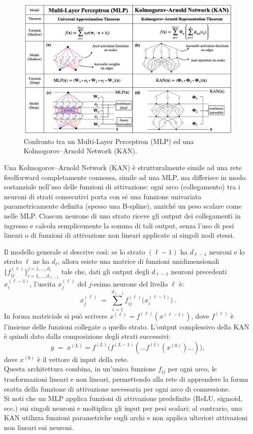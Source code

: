 \documentclass[a4paper,12pt]{report}
\begin{document}
	\begin{figure}[H]
		\centering
		\includegraphics[width=1.0\textwidth]{img/KANvsMLP.png}
		\caption{Confronto tra un Multi-Layer Perceptron (MLP) ed una Kolmogorov–Arnold Network (KAN).}
	\end{figure}
	Una Kolmogorov–Arnold Network (KAN) è strutturalmente simile ad una rete feedforward completamente connessa, simile ad una MLP, ma differisce in modo sostanziale nell'uso delle funzioni di attivazione: ogni arco (collegamento) tra i neuroni di strati consecutivi porta con sé una funzione univariata parametricamente definita (spesso una B-spline), anziché un peso scalare come nelle MLP. Ciascun neurone di uno strato riceve gli output dei collegamenti in ingresso e calcola semplicemente la somma di tali output, senza l’uso di pesi lineari o di funzioni di attivazione non lineari applicate ai singoli nodi stessi.
	
	Il modello generale si descrive così: se lo strato $(\ell-1)$ ha $d_{\ell-1}$ neuroni e lo strato $\ell$ ne ha $d_\ell$, allora esiste una matrice di funzioni unidimensionali $\{f^{(\ell)}_{ij}\}_{i=1,\dots,d_{\ell-1}}^{j=1,\dots,d_\ell}$ tale che, dati gli output degli $d_{\ell-1}$ neuroni precedenti $x_i^{(\ell-1)}$, l’uscita $x_j^{(\ell)}$ del $j$-esimo neurone del livello $\ell$ è: 
	\[
	x_j^{(\ell)} \;=\; \sum_{i=1}^{d_{\ell-1}} f^{(\ell)}_{ij}\bigl(x_i^{(\ell-1)}\bigr)\,.
	\] 
	In forma matriciale si può scrivere $x^{(\ell)} = f^{(\ell)}(x^{(\ell-1)})$, dove $f^{(\ell)}$ è l’insieme delle funzioni collegate a quello strato. L’output complessivo della KAN è quindi dato dalla composizione degli strati successivi: 
	\[
	y \;=\; x^{(L)} 
	= f^{(L)}\bigl(f^{(L-1)}(\dots f^{(1)}(x^{(0)})\dots)\bigr)\!,
	\] 
	dove $x^{(0)}$ è il vettore di input della rete. \\
	Questa architettura combina, in un’unica funzione $f_{ij}$ per ogni arco, le trasformazioni lineari e non lineari, permettendo alla rete di apprendere la forma esatta della funzione di attivazione necessaria per ogni arco di connessione. \\
	Si noti che un MLP applica funzioni di attivazione predefinite (ReLU, sigmoid, ecc.) sui singoli neuroni e moltiplica gli input per pesi scalari; al contrario, una KAN utilizza funzioni parametriche sugli archi e non applica ulteriori attivazioni non lineari sui neuroni.
	
\end{document}
